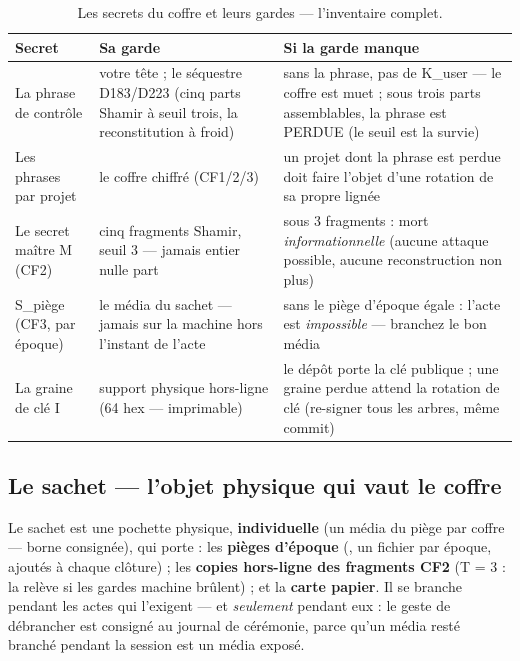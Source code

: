 \begin{table}[htbp]
\centering\small
\caption{Les secrets du coffre et leurs gardes — l'inventaire complet.}
\label{tab:inventaire}
\begin{tabularx}{\textwidth}{@{}l Y Y@{}}
\toprule
\textbf{Secret} & \textbf{Sa garde} & \textbf{Si la garde manque} \\
\midrule
La phrase de contrôle & votre tête ; le séquestre D183/D223 (cinq parts
Shamir à seuil trois, la reconstitution à froid) & sans la phrase, pas de
K\_user — le coffre est muet ; sous trois parts assemblables, la phrase est
PERDUE (le seuil est la survie) \\
Les phrases par projet & le coffre chiffré (CF1/2/3) & un projet dont la phrase est
perdue doit faire l'objet d'une rotation de sa propre lignée \\
Le secret maître M (CF2) & cinq fragments Shamir, seuil 3 — jamais entier nulle part &
sous 3 fragments : mort \emph{informationnelle} (aucune attaque possible, aucune
reconstruction non plus) \\
S\_piège (CF3, par époque) & le média du sachet — jamais sur la machine hors l'instant
de l'acte & sans le piège d'époque égale : l'acte est \emph{impossible} — branchez le
bon média \\
La graine de clé I & support physique hors-ligne (64 hex — imprimable) & le dépôt
porte la clé publique ; une graine perdue attend la rotation de clé (re-signer tous
les arbres, même commit) \\
\bottomrule
\end{tabularx}
\end{table}

\subsection{Le sachet — l'objet physique qui vaut le coffre}

Le sachet est une pochette physique, \textbf{individuelle} (un média du piège par
coffre — borne consignée), qui porte : les \textbf{pièges d'époque}
(, un fichier par époque, ajoutés à chaque clôture) ; les
\textbf{copies hors-ligne des fragments CF2} (T = 3 : la relève si les gardes machine
brûlent) ; et la \textbf{carte papier}. Il se branche pendant les actes qui l'exigent —
et \emph{seulement} pendant eux : le geste de débrancher est consigné au journal de
cérémonie, parce qu'un média resté branché pendant la session est un média exposé.

